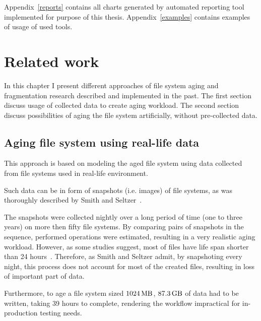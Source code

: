 \documentclass[
  color, %
  table, %
  lof,   %
  lot,   %
]{fithesis3}
\begin{document}
Appendix~\ref{reports} contains all charts generated by automated reporting tool implemented for purpose of this thesis. Appendix~\ref{examples} contains examples of usage of used tools.  

\chapter{Related work}
\label{related}
In this chapter I present different approaches of file system aging and fragmentation research described and implemented in the past. The first section discuss usage of collected data to create aging workload. The second section discuss possibilities of aging the file system artificially, without pre-collected data.

\section{Aging file system using real-life data}
This approach is based on modeling the aged file system using data collected from file systems used in real-life environment.

Such data can be in form of snapshots (i.e. images) of file systems, as was thoroughly described by Smith and Seltzer~\cite{Smith:1997:FSA:258623.258689}.

The snapshots were collected nightly over a long period of time (one to three years) on more then fifty file systems. By comparing pairs of snapshots in the sequence, performed operations were estimated, resulting in a very realistic aging workload. However, as some studies suggest, most of files have life span shorter than 24 hours~\cite{Ousterhout:1985:TAU:323647.323631}. Therefore, as Smith and Seltzer admit, by snapshoting every night, this process does not account for most of the created files, resulting in loss of important part of data.

Furthermore, to age a file system sized $\SI{1024}{\mega\byte}$, $\SI{87.3}{\giga\byte}$ of data had to be written, taking 39 hours to complete, rendering the workflow impractical for in-production testing needs.

\end{document}
